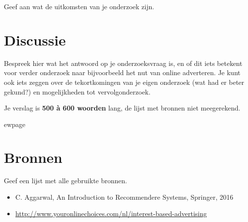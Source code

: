 \documentclass[11pt]{article}
\begin{document}
Geef aan wat de uitkomsten van je onderzoek zijn.

\section*{Discussie}

Bespreek hier wat het antwoord op je onderzoeksvraag is, en of dit iets betekent voor verder onderzoek naar bijvoorbeeld het nut van online adverteren. Je kunt ook iets zeggen over de tekortkomingen van je eigen onderzoek (wat had er beter gekund?) en mogelijkheden tot vervolgonderzoek. 

Je verslag is  \textbf{500 \`a 600 woorden} lang,  de lijst met bronnen niet meegerekend. 


ewpage
\section*{Bronnen}

Geef een lijst met alle gebruikte bronnen.

\begin{itemize}
\item C. Aggarwal, An Introduction to Recommendere Systems, Springer, 2016
\item \url{http://www.youronlinechoices.com/nl/interest-based-advertising}
\end{itemize}
\end{document}
